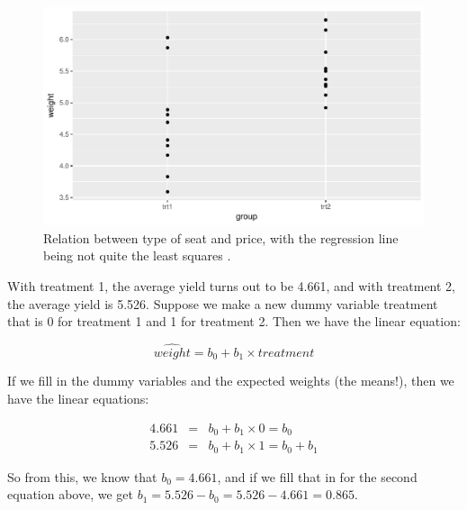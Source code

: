 \documentclass[]{report}\usepackage[]{graphicx}\usepackage[]{color}
\makeatletter
\def\maxwidth{ %
  \ifdim\Gin@nat@width>\linewidth
    \linewidth
  \else
    \Gin@nat@width
  \fi
}
\newenvironment{knitrout}{}{} %
\makeatother
\begin{document}
\begin{knitrout}
\color{fgcolor}\begin{figure}

{\centering \includegraphics[width=\maxwidth]{figure/dummy_8-1} 

}

\caption[Relation between type of seat and price, with the regression line being not quite the least squares ]{Relation between type of seat and price, with the regression line being not quite the least squares .}\label{fig:dummy_8}
\end{figure}


\end{knitrout}

With treatment 1, the average yield turns out to be 4.661, and with treatment 2, the average yield is 5.526. Suppose we make a new dummy variable treatment that is 0 for treatment 1 and 1 for treatment 2. Then we have the linear equation:

\begin{equation}
\widehat{weight} = b_0 + b_1 \times treatment
\end{equation}

If we fill in the dummy variables and the expected weights (the means!), then we have the linear equations:


\begin{eqnarray}
4.661 &=& b_0 + b_1 \times 0 = b_0 \\
5.526 &=& b_0 + b_1 \times 1 = b_0 + b_1
\end{eqnarray}

So from this, we know that $b_0 = 4.661$, and if we fill that in for the second equation above, we get $b_1 = 5.526-b_0= 5.526 -4.661= 0.865$.
\end{document}

